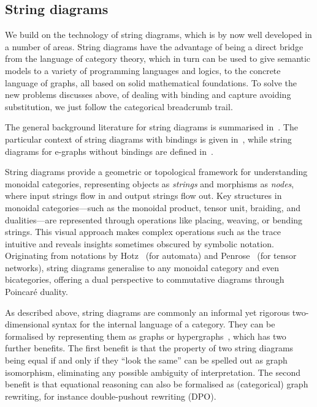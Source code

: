 \documentclass[]{IEEEtran}
\begin{document}
\subsection{String diagrams}

We build on the technology of string diagrams, which is by now well developed in a number of areas. 
String diagrams have the advantage of being a direct bridge from the language of category theory, which in turn can be used to give semantic models to a variety of programming languages and logics, to the concrete language of graphs, all based on solid mathematical foundations. 
To solve the new problems discusses above, of dealing with binding and capture avoiding substitution, we just follow the categorical breadcrumb trail.

The general background literature for string diagrams is summarised in~\cite{piedeleu2023introductionstringdiagramscomputer}.
The particular context of string diagrams with bindings is given in~\cite{ghica2024stringdiagramslambdacalculifunctional}, while string diagrams for e-graphs without bindings are defined in~\cite{ghica2024equivalencehypergraphsegraphsmonoidal}.

String diagrams provide a geometric or topological framework for understanding monoidal categories, representing objects as \emph{strings} and morphisms as \emph{nodes}, where input strings flow in and output strings flow out. 
Key structures in monoidal categories---such as the monoidal product, tensor unit, braiding, and dualities---are represented through operations like placing, weaving, or bending strings. 
This visual approach makes complex operations such as the trace intuitive and reveals insights sometimes obscured by symbolic notation. 
Originating from notations by Hotz~\cite{hotzsd} (for automata) and Penrose~\cite{penrose1984spinors} (for tensor networks), string diagrams generalise to any monoidal category and even bicategories, offering a dual perspective to commutative diagrams through Poincaré duality. 

As described above, string diagrams are commonly an informal yet rigorous two-dimensional syntax for the internal language of a category. 
They can be formalised by representing them as graphs or hypergraphs~\cite{bonchi_string_2022-1}, which has two further benefits. 
The first benefit is that the property of two string diagrams being equal if and only if they ``look the same'' can be spelled out as graph isomorphism, eliminating any possible ambiguity of interpretation. 
The second benefit is that equational reasoning can also be formalised as (categorical) graph rewriting, for instance double-pushout rewriting (DPO). 
\end{document}
